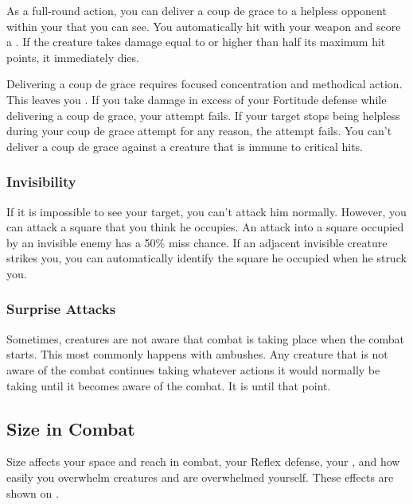            \label{Coup de Grace} As a full-round action, you can deliver a coup de grace to a helpless opponent within your  that you can see.
            You automatically hit with your weapon and score a . If the creature takes damage equal to or higher than half its maximum hit points, it immediately dies.

            Delivering a coup de grace requires focused concentration and methodical action. This leaves you . If you take damage in excess of your Fortitude defense while delivering a coup de grace, your attempt fails.
            If your target stops being helpless during your coup de grace attempt for any reason, the attempt fails.
            You can't deliver a coup de grace against a creature that is immune to critical hits.

        \subsubsection{Invisibility}\label{Invisibility}
            If it is impossible to see your target, you can't attack him normally. However, you can attack a square that you think he occupies. An attack into a square occupied by an invisible enemy has a 50\% miss chance. If an adjacent invisible creature strikes you, you can automatically identify the square he occupied when he struck you.

        \subsubsection{Surprise Attacks}\label{Surprise Attacks}
            Sometimes, creatures are not aware that combat is taking place when the combat starts. This most commonly happens with ambushes. Any creature that is not aware of the combat continues taking whatever actions it would normally be taking until it becomes aware of the combat. It is \unaware until that point.

    \subsection{Size in Combat}\label{Size in Combat}
        Size affects your space and reach in combat, your Reflex defense, your , and how easily you overwhelm creatures and are overwhelmed yourself.
        These effects are shown on .

